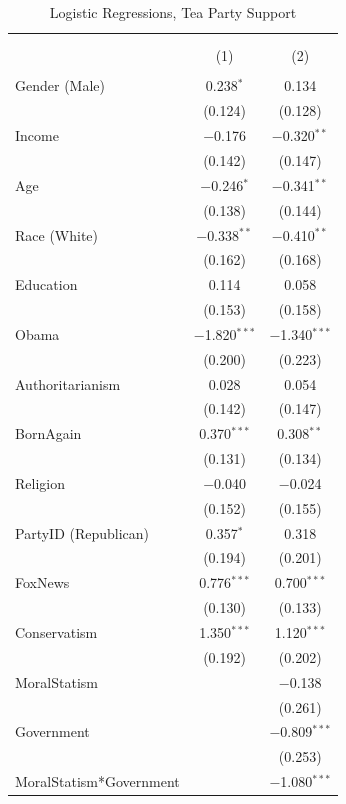 \documentclass[12pt,]{article}
\begin{document}
\begin{table}[!htbp] \centering 
  \caption{Logistic Regressions, Tea Party Support} 
  \label{} 
\footnotesize 
\begin{tabular}{@{\extracolsep{5pt}}lcc} 
\\[-1.8ex]\hline 
\hline \\[-1.8ex] 
\\[-1.8ex] & (1) & (2)\\ 
\hline \\[-1.8ex] 
 Gender (Male) & 0.238$^{*}$ & 0.134 \\ 
  & (0.124) & (0.128) \\ 
  Income & $-$0.176 & $-$0.320$^{**}$ \\ 
  & (0.142) & (0.147) \\ 
  Age & $-$0.246$^{*}$ & $-$0.341$^{**}$ \\ 
  & (0.138) & (0.144) \\ 
  Race (White) & $-$0.338$^{**}$ & $-$0.410$^{**}$ \\ 
  & (0.162) & (0.168) \\ 
  Education & 0.114 & 0.058 \\ 
  & (0.153) & (0.158) \\ 
  Obama & $-$1.820$^{***}$ & $-$1.340$^{***}$ \\ 
  & (0.200) & (0.223) \\ 
  Authoritarianism & 0.028 & 0.054 \\ 
  & (0.142) & (0.147) \\ 
  BornAgain & 0.370$^{***}$ & 0.308$^{**}$ \\ 
  & (0.131) & (0.134) \\ 
  Religion & $-$0.040 & $-$0.024 \\ 
  & (0.152) & (0.155) \\ 
  PartyID (Republican) & 0.357$^{*}$ & 0.318 \\ 
  & (0.194) & (0.201) \\ 
  FoxNews & 0.776$^{***}$ & 0.700$^{***}$ \\ 
  & (0.130) & (0.133) \\ 
  Conservatism & 1.350$^{***}$ & 1.120$^{***}$ \\ 
  & (0.192) & (0.202) \\ 
  MoralStatism &  & $-$0.138 \\ 
  &  & (0.261) \\ 
  Government &  & $-$0.809$^{***}$ \\ 
  &  & (0.253) \\ 
  MoralStatism*Government &  & $-$1.080$^{***}$ \\ 

\end{tabular}
\end{table}
\end{document}
